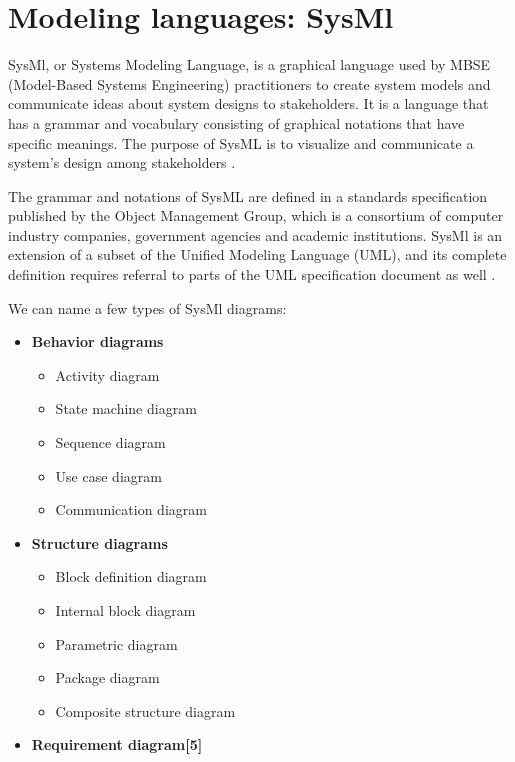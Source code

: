 \section{\fontsize{15}{18}\selectfont Modeling languages: SysMl}

SysMl, or Systems Modeling Language, is a graphical language used by MBSE (Model-Based Systems Engineering) practitioners to create system models and communicate ideas about system designs to stakeholders. It is a language that has a grammar and vocabulary consisting of graphical notations that have specific meanings. The purpose of SysML is to visualize and communicate a system's design among stakeholders \cite{sysml_modeling}.

The grammar and notations of SysML are defined in a standards specification published by the Object Management Group, which is a consortium of computer industry companies, government agencies and academic institutions. SysMl is an extension of a subset of the Unified Modeling Language (UML), and its complete definition requires referral to parts of the UML specification document as well \cite{sysml_modeling}.

We can name a few types of SysMl diagrams:

\begin{minipage}[t]{0.60\textwidth}
\begin{itemize}
    \item \textbf{Behavior diagrams \cite{sysml_modeling}}
    \begin{itemize}
        \item Activity diagram
        \item State machine diagram
        \item Sequence diagram
        \item Use case diagram
        \item Communication diagram
    \end{itemize}

    \item \textbf{Structure diagrams \cite{sysml_modeling}}
    \begin{itemize}
        \item Block definition diagram
        \item Internal block diagram
        \item Parametric diagram
        \item Package diagram
        \item Composite structure diagram
    \end{itemize}

    \item \textbf{Requirement diagram[5]}
\end{itemize}
\end{minipage}
\hspace{-0.02\textwidth}
\begin{minipage}[t]{0.35\textwidth}
\centering
\vspace{1cm}
\label{fig:chapter1-7}
\end{minipage}

